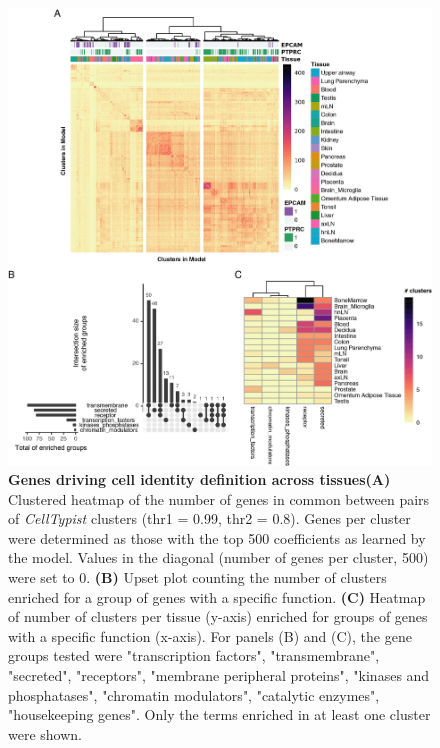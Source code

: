 \begin{figure}[pht!]
    \centering
    \includegraphics[scale=0.835]{Chapter4/Figs/chap4_genesAnalysis.png} %
    \caption[Genes driving cell identity definition across tissues]{\textbf{Genes driving cell identity definition across tissues}\newline\textbf{(A)} Clustered heatmap of the number of genes in common between pairs of \textit{CellTypist} clusters (thr1 = 0.99, thr2 = 0.8). Genes per cluster were determined as those with the top 500 coefficients as learned by the model. Values in the diagonal (number of genes per cluster, 500) were set to 0. \textbf{(B)} Upset plot counting the number of clusters enriched for a group of genes with a specific function. \textbf{(C)} Heatmap of number of clusters per tissue (y-axis) enriched for groups of genes with a specific function (x-axis). For panels (B) and (C), the gene groups tested were "transcription factors", "transmembrane", "secreted", "receptors", "membrane peripheral proteins", "kinases and phosphatases", "chromatin modulators", "catalytic enzymes", "housekeeping genes". Only the terms enriched in at least one cluster were shown.}
    \label{fig:chap4_genetypes}
\end{figure}

